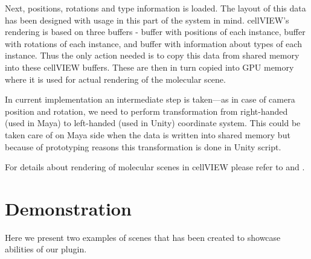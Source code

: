 \documentclass[
  digital, %
  table,   %
  nolof,     %
  nolot,     %
]{fithesis3}
\begin{document}
Next, positions, rotations and type information is loaded. The layout of this data has been designed with usage in this part of the system in mind. cellVIEW's rendering is based on three buffers - buffer with positions of each instance, buffer with rotations of each instance, and buffer with information about types of each instance. Thus the only action needed is to copy this data from shared memory into these cellVIEW buffers. These are then in turn copied into GPU memory where it is used for actual rendering of the molecular scene.

In current implementation an intermediate step is taken—as in case of camera position and rotation, we need to perform transformation from right-handed (used in Maya) to left-handed (used in Unity) coordinate system. This could be taken care of on Maya side when the data is written into shared memory but because of prototyping reasons this transformation is done in Unity script.

For details about rendering of molecular scenes in cellVIEW please refer to \cite{lemuzic-2014-ivm} and \cite{cellVIEW_2015}.

\chapter{Demonstration}
\label{chap:demonstration}
Here we present two examples of scenes that has been created to showcase abilities of our plugin.
\end{document}
